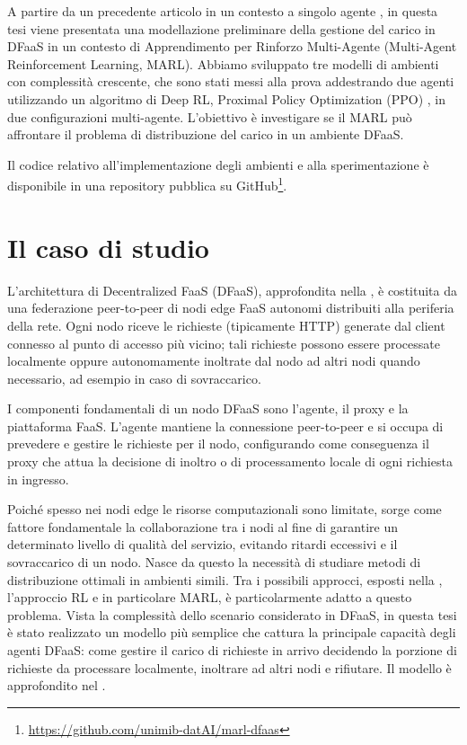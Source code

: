 A partire da un precedente articolo in un contesto a singolo agente \cite{Petriglia2024}, in questa tesi viene presentata una modellazione preliminare della gestione del carico in DFaaS in un contesto di Apprendimento per Rinforzo Multi-Agente (Multi-Agent Reinforcement Learning, MARL). Abbiamo sviluppato tre modelli di ambienti con complessità crescente, che sono stati messi alla prova addestrando due agenti utilizzando un algoritmo di Deep RL, Proximal Policy Optimization (PPO) \cite{Schulman2017}, in due configurazioni multi-agente. L'obiettivo è investigare se il MARL può affrontare il problema di distribuzione del carico in un ambiente DFaaS.

Il codice relativo all'implementazione degli ambienti e alla sperimentazione è disponibile in una repository pubblica su GitHub\footnote{\url{https://github.com/unimib-datAI/marl-dfaas}}.

\section{Il caso di studio}

L'architettura di Decentralized FaaS (DFaaS), approfondita nella , è costituita da una federazione peer-to-peer di nodi edge FaaS autonomi distribuiti alla periferia della rete. Ogni nodo riceve le richieste (tipicamente HTTP) generate dal client connesso al punto di accesso più vicino; tali richieste possono essere processate localmente oppure autonomamente inoltrate dal nodo ad altri nodi quando necessario, ad esempio in caso di sovraccarico.

I componenti fondamentali di un nodo DFaaS sono l'agente, il proxy e la piattaforma FaaS. L'agente mantiene la connessione peer-to-peer e si occupa di prevedere e gestire le richieste per il nodo, configurando come conseguenza il proxy che attua la decisione di inoltro o di processamento locale di ogni richiesta in ingresso.

Poiché spesso nei nodi edge le risorse computazionali sono limitate, sorge come fattore fondamentale la collaborazione tra i nodi al fine di garantire un determinato livello di qualità del servizio, evitando ritardi eccessivi e il sovraccarico di un nodo. Nasce da questo la necessità di studiare metodi di distribuzione ottimali in ambienti simili. Tra i possibili approcci, esposti nella , l'approccio RL e in particolare MARL, è particolarmente adatto a questo problema. Vista la complessità dello scenario considerato in DFaaS, in questa tesi è stato realizzato un modello più semplice che cattura la principale capacità degli agenti DFaaS: come gestire il carico di richieste in arrivo decidendo la porzione di richieste da processare localmente, inoltrare ad altri nodi e rifiutare. Il modello è approfondito nel .

